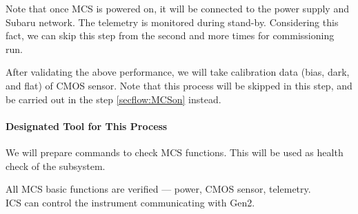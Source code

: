 
Note that once MCS is powered on, it will be connected to the power supply and Subaru network.
The telemetry is monitored during stand-by.
Considering this fact, we can skip this step from the second and more times for commissioning run.

After validating the above performance, we will take calibration data (bias, dark, and flat) of CMOS sensor.
Note that this process will be skipped in this step, and be carried out in the step \ref{secflow:MCSon} instead.

\paragraph{Designated Tool for This Process}
We will prepare commands to check MCS functions.
This will be used as health check of the subsystem.

\begin{itembox}[l]{}
All MCS basic functions are verified --- power, CMOS sensor, telemetry. \\
ICS can control the instrument communicating with Gen2.

\end{itembox}